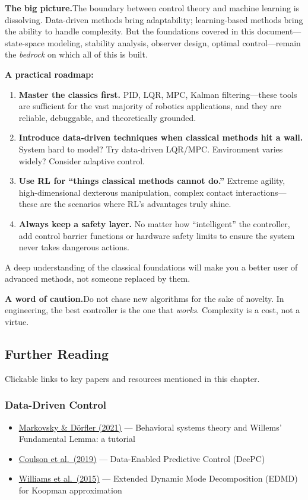 \begin{mdframed}
\textbf{The big picture.}\;The boundary between control theory and machine learning is dissolving. Data-driven methods bring adaptability; learning-based methods bring the ability to handle complexity. But the foundations covered in this document---state-space modeling, stability analysis, observer design, optimal control---remain the \emph{bedrock} on which all of this is built.

\textbf{A practical roadmap:}
\begin{enumerate}[nosep]
    \item \textbf{Master the classics first.} PID, LQR, MPC, Kalman filtering---these tools are sufficient for the vast majority of robotics applications, and they are reliable, debuggable, and theoretically grounded.
    \item \textbf{Introduce data-driven techniques when classical methods hit a wall.} System hard to model? Try data-driven LQR/MPC. Environment varies widely? Consider adaptive control.
    \item \textbf{Use RL for ``things classical methods cannot do.''} Extreme agility, high-dimensional dexterous manipulation, complex contact interactions---these are the scenarios where RL's advantages truly shine.
    \item \textbf{Always keep a safety layer.} No matter how ``intelligent'' the controller, add control barrier functions or hardware safety limits to ensure the system never takes dangerous actions.
\end{enumerate}

A deep understanding of the classical foundations will make you a better user of advanced methods, not someone replaced by them.

\textbf{A word of caution.}\;Do not chase new algorithms for the sake of novelty. In engineering, the best controller is the one that \textit{works}. Complexity is a cost, not a virtue.
\end{mdframed}

\subsection{Further Reading}

Clickable links to key papers and resources mentioned in this chapter.

\subsubsection*{Data-Driven Control}
\begin{itemize}[nosep]
    \item \href{https://arxiv.org/abs/2206.00397}{Markovsky \& Dörfler (2021)} --- Behavioral systems theory and Willems' Fundamental Lemma: a tutorial
    \item \href{https://arxiv.org/abs/1811.05890}{Coulson et al.\ (2019)} --- Data-Enabled Predictive Control (DeePC)
    \item \href{https://arxiv.org/abs/1408.4408}{Williams et al.\ (2015)} --- Extended Dynamic Mode Decomposition (EDMD) for Koopman approximation
\end{itemize}


